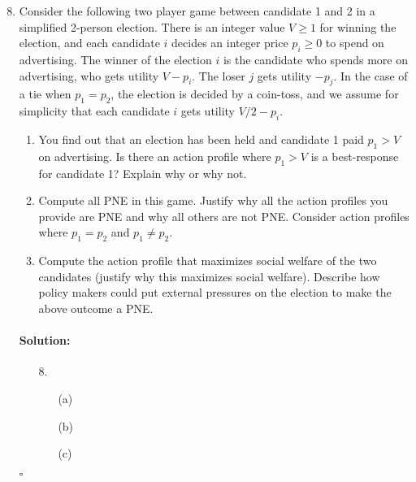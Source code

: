 \documentclass[11pt,letterpaper]{article}
\newif \iftemplate \templatetrue
\newenvironment{solution}{\paragraph{Solution:}}{\hfill$\square$}
\theoremstyle{definition}
\begin{document}
\begin{enumerate}
\setcounter{enumi}{7}

\item Consider the following two player game between candidate 1 and 2 in a simplified 2-person election. 
There is an integer value $V \ge 1$ for winning the election, and each candidate $i$ decides an integer price $p_i \ge 0$ to spend on advertising.
The winner of the election $i$ is the candidate who spends more on advertising, who gets utility $V - p_i$. The loser $j$ gets utility $-p_j$.
In the case of a tie when $p_1 = p_2$, the election is decided by a coin-toss, and we assume for simplicity that each candidate $i$ gets utility $V/2 - p_i$.
\begin{enumerate}
\item You find out that an election has been held and candidate 1 paid $p_1 > V$ on advertising. Is there an action profile where $p_1 > V$ is a best-response for candidate 1? Explain why or why not.
\item Compute all PNE in this game. Justify why all the action profiles you provide are PNE and why all others are not PNE. 
Consider action profiles where $p_1 = p_2$ and $p_1 \not = p_2$.
\item Compute the action profile that maximizes social welfare of the two candidates (justify why this maximizes social welfare). Describe how policy makers could put external pressures on the election to make the above outcome a PNE.
\end{enumerate}

\iftemplate
\begin{solution}
\begin{enumerate}
\item[8.]
\begin{enumerate}
\item[(a)]
\item[(b)]
\item[(c)]
\end{enumerate}
\end{enumerate}
\end{solution}
\newpage
\fi

\begin{figure}[t!]
\begin{center}
\end{center}
\end{figure}
\end{enumerate}
\end{document}
